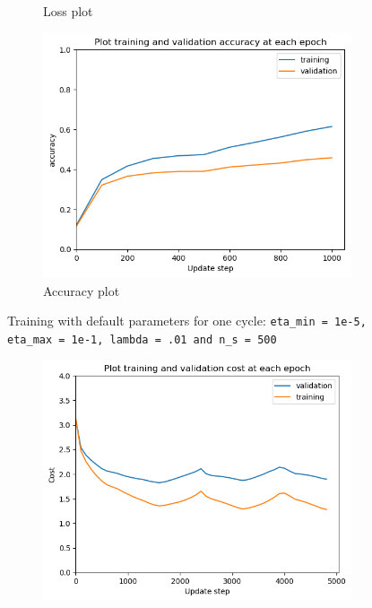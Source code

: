 \documentclass[12pt]{article}
\newenvironment{question}[2][Question]{\begin{trivlist}
\kern10pt
\item[\hskip \labelsep {\bfseries #1}\hskip \labelsep {\bfseries #2.}]}{\end{trivlist}}
\begin{document}
\begin{question}{ii}
\begin{figure}[!htb]
\begin{subfigure}[b]{0.32\textwidth}
        \caption{Loss plot}
    \end{subfigure}\hfill
    \begin{subfigure}[b]{0.32\textwidth}%
        \includegraphics[width=\linewidth]{f3_acc_plt.png}
        \caption{Accuracy plot}
    \end{subfigure}
    \caption{
        Training with default parameters for one cycle:
        \texttt{eta\_min = 1e-5, eta\_max = 1e-1,  lambda = .01 and n\_s = 500}
    }
    \label{fig:replicate_f3}
\end{figure}
\begin{figure}[!htb]
    \begin{subfigure}[b]{0.32\textwidth}
        \includegraphics[width=\linewidth]{f4_cost_plt.png}

\end{subfigure}
\end{figure}
\end{question}
\end{document}
